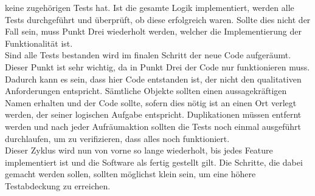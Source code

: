 keine zugehörigen Tests hat. Ist die gesamte Logik implementiert, werden alle 
Tests durchgeführt und überprüft, ob diese erfolgreich waren. Sollte dies nicht 
der Fall sein, muss Punkt Drei wiederholt werden, welcher die Implementierung 
der Funktionalität ist.
\\
Sind alle Tests bestanden wird im finalen Schritt der neue Code aufgeräumt.
Dieser Punkt ist sehr wichtig, da in Punkt Drei der Code nur funktionieren 
muss. Dadurch kann es sein, dass hier Code entstanden ist, der nicht den 
qualitativen Anforderungen entspricht. Sämtliche Objekte sollten einen 
aussagekräftigen Namen erhalten und der Code sollte, sofern dies nötig ist an 
einen Ort verlegt werden, der seiner logischen Aufgabe entspricht. 
Duplikationen müssen entfernt werden und nach jeder Aufräumaktion sollten die 
Tests noch einmal ausgeführt durchlaufen, um zu verifizieren, dass alles noch 
funktioniert.
\newline
\\
Dieser Zyklus wird nun von vorne so lange wiederholt, bis jedes Feature 
implementiert ist und die Software als fertig gestellt gilt. Die Schritte, die 
dabei gemacht werden sollen, sollten möglichst klein sein, um eine höhere 
Testabdeckung zu erreichen.